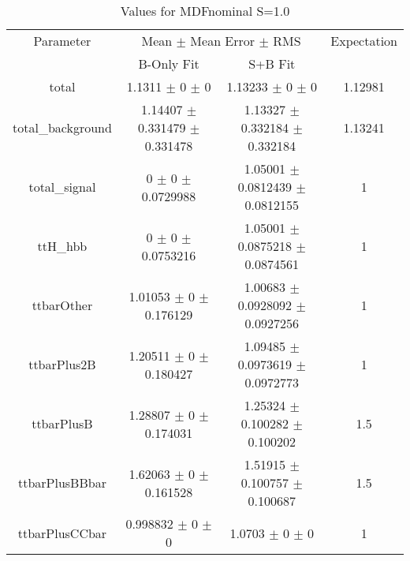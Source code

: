 \begin{table}
\centering
\caption{Values for MDFnominal S=1.0}
\begin{tabular}{cccc}
\toprule
Parameter & \multicolumn{2}{c}{Mean $\pm$ Mean Error $\pm$ RMS} & Expectation\\
 & B-Only Fit & S+B Fit & \\
\midrule
total & \num{1.1311} $\pm$ \num{0} $\pm$ \num{0} & \num{1.13233} $\pm$ \num{0} $\pm$ \num{0} & \num{1.12981}\\
total\_background & \num{1.14407} $\pm$ \num{0.331479} $\pm$ \num{0.331478} & \num{1.13327} $\pm$ \num{0.332184} $\pm$ \num{0.332184} & \num{1.13241}\\
total\_signal & \num{0} $\pm$ \num{0} $\pm$ \num{0.0729988} & \num{1.05001} $\pm$ \num{0.0812439} $\pm$ \num{0.0812155} & \num{1}\\
ttH\_hbb & \num{0} $\pm$ \num{0} $\pm$ \num{0.0753216} & \num{1.05001} $\pm$ \num{0.0875218} $\pm$ \num{0.0874561} & \num{1}\\
ttbarOther & \num{1.01053} $\pm$ \num{0} $\pm$ \num{0.176129} & \num{1.00683} $\pm$ \num{0.0928092} $\pm$ \num{0.0927256} & \num{1}\\
ttbarPlus2B & \num{1.20511} $\pm$ \num{0} $\pm$ \num{0.180427} & \num{1.09485} $\pm$ \num{0.0973619} $\pm$ \num{0.0972773} & \num{1}\\
ttbarPlusB & \num{1.28807} $\pm$ \num{0} $\pm$ \num{0.174031} & \num{1.25324} $\pm$ \num{0.100282} $\pm$ \num{0.100202} & \num{1.5}\\
ttbarPlusBBbar & \num{1.62063} $\pm$ \num{0} $\pm$ \num{0.161528} & \num{1.51915} $\pm$ \num{0.100757} $\pm$ \num{0.100687} & \num{1.5}\\
ttbarPlusCCbar & \num{0.998832} $\pm$ \num{0} $\pm$ \num{0} & \num{1.0703} $\pm$ \num{0} $\pm$ \num{0} & \num{1}\\
\bottomrule
\end{tabular}
\end{table}